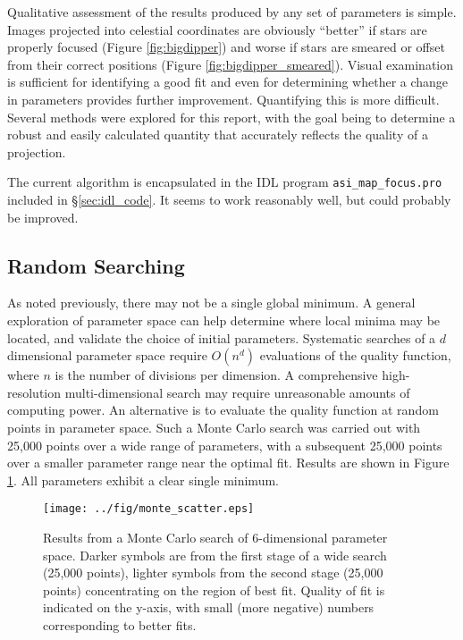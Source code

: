 \documentclass[11pt,twoside]{article}   %
\begin{document}
Qualitative assessment of the results produced by any set of
parameters is simple.  Images projected into celestial coordinates
are obviously ``better'' if stars are properly focused (Figure
\ref{fig:bigdipper}) and worse if stars are smeared or offset from
their correct positions (Figure \ref{fig:bigdipper_smeared}).
Visual examination is sufficient for identifying a good fit and
even for determining whether a change in parameters provides
further improvement.  Quantifying this is more difficult.  Several
methods were explored for this report, with the goal being to
determine a robust and easily calculated quantity that accurately
reflects the quality of a projection.

The current algorithm is encapsulated in the IDL program
{\verb!asi_map_focus.pro!} included in \S \ref{sec:idl_code}. It
seems to work reasonably well, but could probably be improved.


 \subsection{Random Searching}

As noted previously, there may not be a single global minimum.  A
general exploration of parameter space can help determine where
local minima may be located, and validate the choice of initial
parameters.  Systematic searches of a $d$ dimensional parameter
space require $O(n^d)$ evaluations of the quality function, where
$n$ is the number of divisions per dimension.  A comprehensive
high-resolution multi-dimensional search may require unreasonable
amounts of computing power.  An alternative is to evaluate the
quality function at random points in parameter space.  Such a
Monte Carlo search was carried out with 25,000 points over a wide
range of parameters, with a subsequent 25,000 points over a
smaller parameter range near the optimal fit.  Results are shown
in Figure \ref{fig:monte_scatter}.  All parameters exhibit a clear
single minimum.

\begin{figure}[htb!]
  \texttt{[image: ../fig/monte\_scatter.eps]}
    \caption[Monte Carlo parameter search]
   {Results from a Monte Carlo search of 6-dimensional parameter space.
    Darker symbols are from the first stage of a wide search (25,000 points),
    lighter symbols from the second stage (25,000 points) concentrating on the
    region of best fit.  Quality of fit is indicated on the
    y-axis, with small (more negative) numbers corresponding to
    better fits.
     \label{fig:monte_scatter} }
\end{figure}
\end{document}
